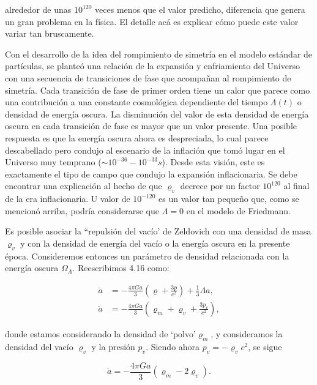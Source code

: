 \documentclass[11pt]{article}
\begin{document}
{    alrededor de unas $10^{120}$ veces menos que el valor predicho, diferencia que genera un gran problema en la física. El detalle acá es explicar cómo puede este valor variar tan bruscamente. 
    
    Con el desarrollo de la idea del rompimiento de simetría en el modelo estándar de partículas, se planteó una relación de la expansión y enfriamiento del Universo con una secuencia de transiciones de fase que acompañan al rompimiento de simetría. Cada transición de fase de primer orden tiene un calor que parece como una contribución a una constante cosmológica dependiente del tiempo $\Lambda(t)$ o densidad de energía oscura. La disminución del valor de esta densidad de energía oscura en cada transición de fase es mayor que un valor presente. Una posible respuesta es que la energía oscura ahora es despreciada, lo cual parece descabellado pero condujo al escenario de la inflación que tomó lugar en el Universo muy temprano ($\sim 10^{-36} - 10^{-33} s$). Desde esta visión, este es exactamente el tipo de campo que condujo la expansión inflacionaria. Se debe encontrar una explicación al hecho de que $\varrho_v$ decrece por un factor $10^{120}$ al final de la era inflacionaria. U valor de $10^{-120}$ es un valor tan pequeño que, como se mencionó arriba, podría considerarse que $\Lambda=0$ en el modelo de Friedmann. 

   Es posible asociar la ``repulsión del vacío' de Zeldovich con una densidad de masa $\varrho_v$ y con la densidad de energía del vacío o la energía oscura en la presente época. Consideremos entonces un parámetro de densidad relacionada con la energía oscura $\Omega_{\Lambda}$. Reescribimos 4.16 como:
   
   \begin{align}
         \ddot{a} & = - \frac{4 \pi Ga}{3}  \left( \varrho + \frac{3p}{c^2} \right) + \frac{1}{3} \Lambda a, \\
          \ddot{a} & = - \frac{4 \pi Ga}{3}  \left( \varrho_m + \varrho_v + \frac{3p_v}{c^2} \right),
   \end{align}
       
    donde estamos considerando la densidad de `polvo'$\varrho_{m}$, y consideramos la densidad del vacío $\varrho_v$ y la presión $p_v$. Siendo ahora $p_v = - \varrho_vc^2$, se sigue
    
    \begin{equation}
        \ddot{a} = - \frac{4 \pi G a}{3}  \left( \varrho_m -2\varrho_v \right).
    \end{equation}
    
}
\end{document}
